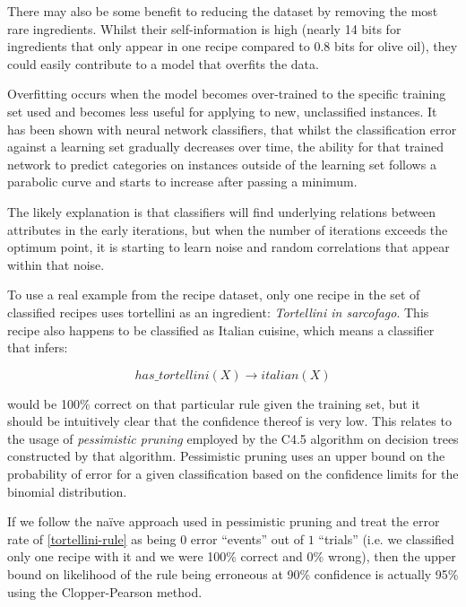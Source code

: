 \documentclass[11pt,a4paper]{article}
\begin{document}
There may also be some benefit to reducing the dataset by removing the most rare
ingredients. Whilst their self-information is high (nearly 14 bits for ingredients
that only appear in one recipe compared to 0.8 bits for olive oil), they could
easily contribute to a model that overfits the data.

Overfitting occurs when the model becomes over-trained to the specific training set
used and becomes less useful for applying to new, unclassified instances. It has
been shown \cite{tetko1995neural} with neural network classifiers, that whilst the
classification error against a learning set gradually decreases over time, the
ability for that trained network to predict categories on instances outside of the
learning set follows a parabolic curve and starts to increase after passing a
minimum.

The likely explanation \cite{tetko1995neural} is that classifiers will find underlying
relations between attributes in the early iterations, but when the number of iterations
exceeds the optimum point, it is starting to learn noise and random correlations that
appear within that noise.

To use a real example from the recipe dataset, only one recipe in the set of
classified recipes uses tortellini as an ingredient: \emph{Tortellini in sarcofago}.
This recipe also happens to be classified as Italian cuisine, which means a classifier
that infers:

\begin{equation} \label{tortellini-rule}
has\_tortellini(X) \to italian(X)
\end{equation}

\noindent would be 100\% correct on that particular
rule given the training set, but it should be intuitively clear that the confidence
thereof is very low. This relates to the usage of \emph{pessimistic pruning} employed
by the C4.5 algorithm \cite{quinlan1993c4} on decision trees constructed by that algorithm.
Pessimistic pruning uses an upper bound on the probability of error for a given classification
based on the confidence limits for the binomial distribution.

If we follow the na\"ive approach used in pessimistic pruning and treat the error rate
of \eqref{tortellini-rule} as being $0$ error ``events'' out of $1$ ``trials'' (i.e.
we classified only one recipe with it and we were 100\% correct and 0\% wrong), then
the upper bound on likelihood of the rule being erroneous at 90\% confidence is
actually 95\% using the Clopper-Pearson method. \cite{clopper1934use}
\end{document}
